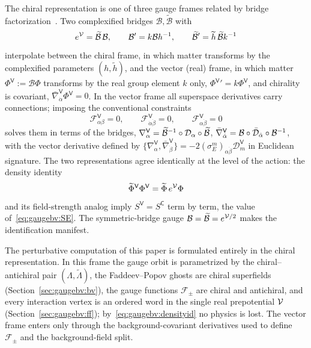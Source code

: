 The chiral representation is one of three gauge frames related by bridge factorization~\cite{GGRS}. Two complexified bridges $\mathcal B,\widetilde{\mathcal B}$ with
\begin{equation}\label{eq:gaugebv:frames}
e^{\mathcal{V}}=\widetilde{\mathcal B}\,\mathcal B,\qquad
\mathcal B'=k\mathcal Bh^{-1},\qquad
\widetilde{\mathcal B}'=\widetilde h\,\widetilde{\mathcal B}k^{-1}
\end{equation}
interpolate between the chiral frame, in which matter transforms by the complexified parameters $(h,\widetilde h)$, and the vector (real) frame, in which matter $\Phi^{\mathsf V}:=\mathcal B\Phi$ transforms by the real group element $k$ only, $\Phi^{\mathsf V}{}'=k\Phi^{\mathsf V}$, and chirality is covariant, $\bar\nabla^{\mathsf V}_{\dot\alpha}\Phi^{\mathsf V}=0$. In the vector frame all superspace derivatives carry connections; imposing the conventional constraints
\begin{equation}\label{eq:gaugebv:constraints}
\mathcal F^{\mathsf V}_{\alpha\beta}=0,\qquad
\mathcal F^{\mathsf V}_{\dot\alpha\dot\beta}=0,\qquad
\mathcal F^{\mathsf V}_{\alpha\dot\beta}=0
\end{equation}
solves them in terms of the bridges, $\nabla^{\mathsf V}_\alpha=\widetilde{\mathcal B}^{-1}\circ\mathcal{D}_\alpha\circ\widetilde{\mathcal B}$, $\bar\nabla^{\mathsf V}_{\dot\alpha}=\mathcal B\circ\bar{\mathcal{D}}_{\dot\alpha}\circ\mathcal B^{-1}$, with the vector derivative defined by $\{\nabla^{\mathsf V}_\alpha,\bar\nabla^{\mathsf V}_{\dot\beta}\}=-2(\sigma_E^m)_{\alpha\dot\beta}\mathcal D^{\mathsf V}_m$ in Euclidean signature. The two representations agree identically at the level of the action: the density identity
\begin{equation}\label{eq:gaugebv:densityid}
\widetilde\Phi^{\mathsf V}\Phi^{\mathsf V}=\widetilde\Phi\,e^{\mathcal{V}}\Phi
\end{equation}
and its field-strength analog imply $S^{\mathsf V}=S^{\mathsf C}$ term by term, the value of~\eqref{eq:gaugebv:SE}. The symmetric-bridge gauge $\mathcal B=\widetilde{\mathcal B}=e^{\mathcal{V}/2}$ makes the identification manifest.

\begin{remark}\label{rem:gaugebv:chiralchoice}
The perturbative computation of this paper is formulated entirely in the chiral representation. In this frame the gauge orbit is parametrized by the chiral--antichiral pair $(\Lambda,\widetilde\Lambda)$, the Faddeev--Popov ghosts are chiral superfields (Section~\ref{sec:gaugebv:bv}), the gauge functions $\mathcal F_\pm$ are chiral and antichiral, and every interaction vertex is an ordered word in the single real prepotential $\mathcal{V}$ (Section~\ref{sec:gaugebv:ff}); by~\eqref{eq:gaugebv:densityid} no physics is lost. The vector frame enters only through the background-covariant derivatives used to define $\mathcal F_\pm$ and the background-field split.
\end{remark}

